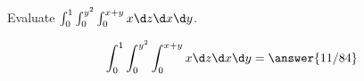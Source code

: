 \documentclass{ximera}
\author{David Guichard \and Neal Koblitz \and H. Jerome Keisler \and Albert Scheller \and Barry Balof \and Mike Wills \and Matthew Carr}
\begin{document}
\begin{exercise}





Evaluate  $\int_{0}^{1}\int_{0}^{y^2}\int_{0}^{x+y}x \d z\d x\d y$.

\begin{prompt}
\[
\int_{0}^{1}\int_{0}^{y^2}\int_{0}^{x+y}x \d z\d x\d y=\answer{11/84}
\]
\end{prompt}



\end{exercise}
\end{document}
